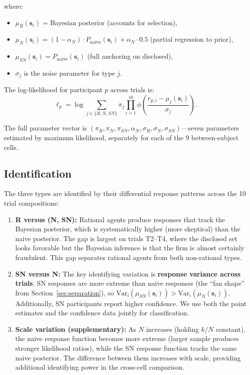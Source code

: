 \documentclass[12pt]{article}
\theoremstyle{definition}
\begin{document}
where:
\begin{itemize}[nosep]
\item $\mu_R(\mathbf{s}_i)$ = Bayesian posterior (accounts for selection),
\item $\mu_N(\mathbf{s}_i) = (1 - \alpha_N) \cdot P_{\text{naive}}(\mathbf{s}_i) + \alpha_N \cdot 0.5$ (partial regression to prior),
\item $\mu_{SN}(\mathbf{s}_i) = P_{\text{naive}}(\mathbf{s}_i)$ (full anchoring on disclosed),
\item $\sigma_j$ is the noise parameter for type $j$.
\end{itemize}

The log-likelihood for participant $p$ across trials is:
\begin{equation}
\ell_p = \log \sum_{j \in \{R, N, SN\}} \pi_j \prod_{i=1}^{10} \phi\left(\frac{r_{p,i} - \mu_j(\mathbf{s}_i)}{\sigma_j}\right).
\label{eq:loglik}
\end{equation}

The full parameter vector is $(\pi_R, \pi_N, \pi_{SN}, \alpha_N, \sigma_R, \sigma_N, \sigma_{SN})$---seven parameters estimated by maximum likelihood, separately for each of the 9 between-subject cells.

\subsection{Identification}

The three types are identified by their differential response patterns across the 10 trial compositions:

\begin{enumerate}[nosep]

\item \textbf{R versus (N, SN):} Rational agents produce responses that track the Bayesian posterior, which is systematically higher (more skeptical) than the naive posterior. The gap is largest on trials T2--T4, where the disclosed set looks favorable but the Bayesian inference is that the firm is almost certainly fraudulent. This gap separates rational agents from both non-rational types.

\item \textbf{SN versus N:} The key identifying variation is \textbf{response variance across trials}. SN responses are more extreme than naive responses (the ``fan shape'' from Section~\ref{sec:separation}), so $\text{Var}_{i}(\mu_{SN}(\mathbf{s}_i)) > \text{Var}_{i}(\mu_N(\mathbf{s}_i))$. Additionally, SN participants report higher confidence. We use both the point estimates and the confidence data jointly for classification.

\item \textbf{Scale variation (supplementary):} As $N$ increases (holding $k/N$ constant), the naive response function becomes more extreme (larger sample produces stronger likelihood ratios), while the SN response function tracks the same naive posterior. The difference between them increases with scale, providing additional identifying power in the cross-cell comparison.

\end{enumerate}
\end{document}
